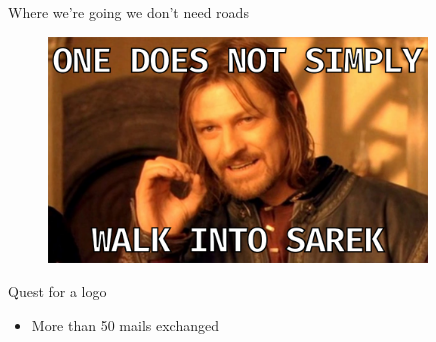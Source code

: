\documentclass{beamer}
\begin{document}
\begin{frame}{Where we're going we don't need roads}
	\begin{figure}
		\includegraphics[height=6cm]{pictures/OneDoesNotSimply-meme.png}
	\end{figure}
\end{frame}


\begin{frame}{Quest for a logo}
	\begin{itemize}
		\item More than 50 mails exchanged
	\end{itemize}
	\pause
\end{frame}
\end{document}
